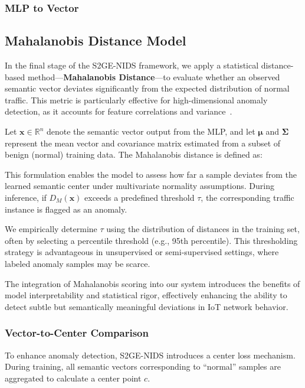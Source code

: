 \begin{ZhChapter}
\subsubsection{MLP to Vector}




\subsection{Mahalanobis Distance Model}
In the final stage of the S2GE-NIDS framework, we apply a statistical distance-based method—\textbf{Mahalanobis Distance}—to evaluate whether an observed semantic vector deviates significantly from the expected distribution of normal traffic. This metric is particularly effective for high-dimensional anomaly detection, as it accounts for feature correlations and variance~\cite{de2000mahalanobis}.

Let $\mathbf{x} \in \mathbb{R}^n$ denote the semantic vector output from the MLP, and let $\boldsymbol{\mu}$ and $\boldsymbol{\Sigma}$ represent the mean vector and covariance matrix estimated from a subset of benign (normal) training data. The Mahalanobis distance is defined as:

This formulation enables the model to assess how far a sample deviates from the learned semantic center under multivariate normality assumptions. During inference, if $D_M(\mathbf{x})$ exceeds a predefined threshold $\tau$, the corresponding traffic instance is flagged as an anomaly.

We empirically determine $\tau$ using the distribution of distances in the training set, often by selecting a percentile threshold (e.g., 95th percentile). This thresholding strategy is advantageous in unsupervised or semi-supervised settings, where labeled anomaly samples may be scarce.

The integration of Mahalanobis scoring into our system introduces the benefits of model interpretability and statistical rigor, effectively enhancing the ability to detect subtle but semantically meaningful deviations in IoT network behavior.


\subsubsection{Vector-to-Center Comparison}
To enhance anomaly detection, S2GE-NIDS introduces a center loss mechanism. During training, all semantic vectors corresponding to ``normal'' samples are aggregated to calculate a center point $c$.


\end{ZhChapter}
